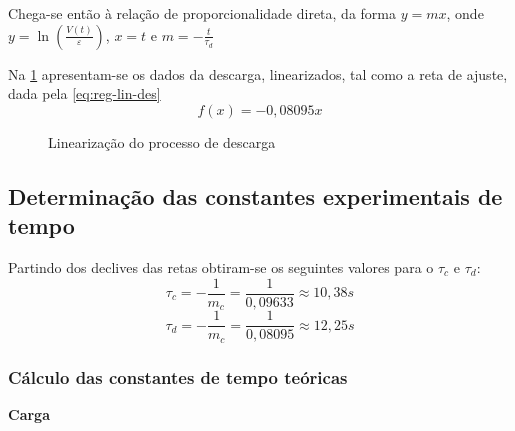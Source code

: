 Chega-se então à relação de proporcionalidade direta, da forma $y = mx$, onde $y = \ln\left(\frac{V(t)}{\varepsilon}\right)$, $x = t$ e $m = -\frac{t}{\tau_d}$

Na \cref{gra:lin-descarga} apresentam-se os dados da descarga, linearizados, tal como a reta de ajuste, dada pela \cref{eq:reg-lin-des}
\begin{equation} \label{eq:reg-lin-des}
	f(x) = -0,08095 x
\end{equation}

\begin{figure}[!ht]
	\centering
	\caption{Linearização do processo de descarga}
	\label{gra:lin-descarga}
\end{figure}
\subsection{Determinação das constantes experimentais de tempo}
Partindo dos declives das retas obtiram-se os seguintes valores para o $\tau_c$ e $\tau_d$:
\begin{equation*}
	\tau_c = -\frac{1}{m_c}
	= \frac{1}{0,09633}
	\approx 10,38s
\end{equation*}
\begin{equation*}
	\tau_d = -\frac{1}{m_c}
	= \frac{1}{0,08095}
	\approx 12,25s
\end{equation*}


\subsubsection{Cálculo das constantes de tempo teóricas}
\textbf{Carga}

